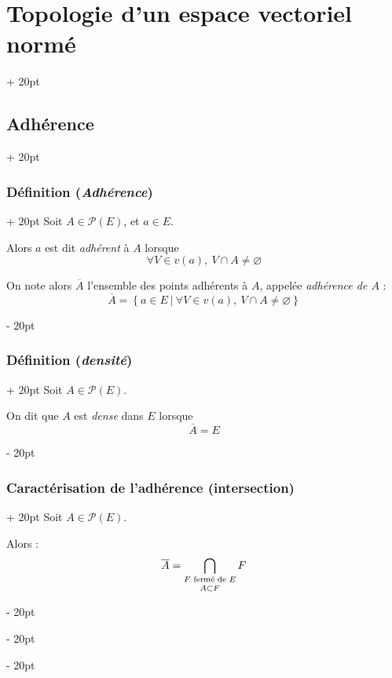 \documentclass[a4paper, 12pt, twoside]{article}
\newcommand{\cj}[1]{\overline{#1}} %
\newcommand{\set}[1]{\left\{ #1 \right\}}
\newcommand{\ind}[1][20pt]{\advance\leftskip + #1}
\newcommand{\deind}[1][20pt]{\advance\leftskip - #1}
\newenvironment{indt}[2][20pt]{#2 \par \ind[#1]}{\par \deind} %
\begin{document}
\begin{indt}{\section{Topologie d'un espace vectoriel normé}}
        \vspace{12pt}
        
        \begin{indt}{\subsection{Adhérence}}
            \begin{indt}{\subsubsection{Définition (\textit{Adhérence})}}
                Soit $A \in \mathcal P(E)$, et $a \in E$.

                Alors $a$ est dit \emph{adhérent} à $A$ lorsque
                \[
                    \forall V \in v(a),\ V \cap A \neq \varnothing
                \]

                On note alors $\cj A$ l'ensemble des points adhérents à $A$, appelée \emph{adhérence de $A$} :
                \[
                    \cj A = \set{a \in E\ |\ \forall V \in v(a),\ V \cap A \neq \varnothing}
                \]
            \end{indt}

            \vspace{12pt}
            
            \begin{indt}{\subsubsection{Définition (\textit{densité})}}
                Soit $A \in \mathcal P(E)$.

                On dit que $A$ est \emph{dense} dans $E$ lorsque
                \[
                    \cj A = E
                \]
            \end{indt}

            \vspace{12pt}
            
            \begin{indt}{\subsubsection{Caractérisation de l'adhérence (intersection)}}
                Soit $A \in \mathcal P(E)$.

                Alors :
                \[
                    \cj A
                    =
                    \bigcap_{\substack{F \text{ fermé de } E \vspace{2pt} \\ A \subset F}} F
                \]


\end{indt}
\end{indt}
\end{indt}
\end{document}
